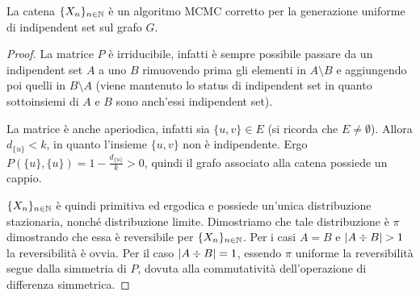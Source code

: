 \begin{thm}
	La catena $\{X_n\}_{n\in\mathbb N}$ è un algoritmo MCMC corretto per la generazione uniforme di indipendent set sul grafo $G$.
\end{thm}
\begin{proof}
	La matrice $P$ è irriducibile, infatti è sempre possibile passare da un indipendent set $A$ a uno $B$ rimuovendo prima gli elementi in $A\setminus B$ e aggiungendo poi quelli in $B\setminus A$ (viene mantenuto lo status di indipendent set in quanto sottoinsiemi di $A$ e $B$ sono anch'essi indipendent set).

	La matrice è anche aperiodica, infatti sia $\{u,v\}\in E$ (si ricorda che $E\ne\emptyset$). Allora $d_{\{u\}}<k$, in quanto l'insieme $\{u,v\}$ non è indipendente. Ergo $P(\{u\},\{u\})=1-\frac{d_{\{u\}}}{k}>0$, quindi il grafo associato alla catena possiede un cappio.

	$\{X_n\}_{n\in\mathbb N}$ è quindi primitiva ed ergodica e possiede un'unica distribuzione stazionaria, nonché distribuzione limite. Dimostriamo che tale distribuzione è $\pi$ dimostrando che essa è reversibile per $\{X_n\}_{n\in\mathbb N}$. Per i casi $A=B$ e $\card{A\div B}>1$ la reversibilità è ovvia. Per il caso $\left|A\div B\right|=1$, essendo $\pi$ uniforme la reversibilità segue dalla simmetria di $P$, dovuta alla commutatività dell'operazione di differenza simmetrica.
\end{proof}
